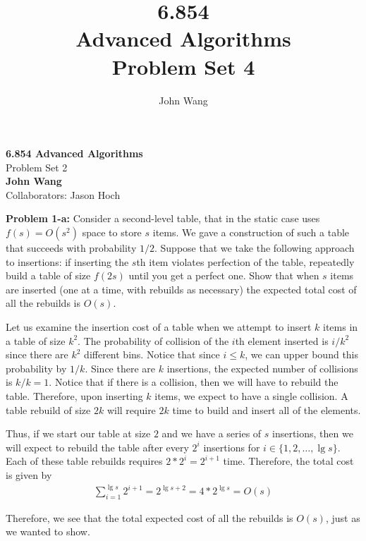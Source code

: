 \documentclass[psamsfonts]{amsart}
\title{6.854 \\
Advanced Algorithms \\
Problem Set 4}
\author{John Wang}
\newenvironment{sol}{\vspace{0.25cm}{\large \bfseries Solution:}}{\qedsymbol}
\newenvironment{prob}[1]{\begin{framed}{\large \bfseries Problem #1:}}{\end{framed}}
\newcommand{\makenewtitle}{
    \begin{center}
    {\huge \bfseries 6.854 Advanced Algorithms} \\
    Problem Set 2\\
    \vspace{0.25cm}
    {\bfseries John Wang} \\
    Collaborators: Jason Hoch
    \end{center}
    \vspace{0.5cm}
}
\begin{document}
\makenewtitle

\begin{prob}{1-a}
Consider a second-level table, that in the static case uses $f(s) = O(s^2)$ space to store $s$ items. We gave a construction of such a table that succeeds with probability $1/2$. Suppose that we take the following approach to insertions: if inserting the $s$th item violates perfection of the table, repeatedly build a table of size $f(2s)$ until you get a perfect one. Show that when $s$ items are inserted (one at a time, with rebuilds as necessary) the expected total cost of all the rebuilds is $O(s)$. 
\end{prob}

\begin{sol}
Let us examine the insertion cost of a table when we attempt to insert $k$ items in a table of size $k^2$. The probability of collision of the $i$th element inserted is $i/k^2$ since there are $k^2$ different bins. Notice that since $i \leq k$, we can upper bound this probability by $1/k$. Since there are $k$ insertions, the expected number of collisions is $k/k = 1$. Notice that if there is a collision, then we will have to rebuild the table. Therefore, upon inserting $k$ items, we expect to have a single collision. A table rebuild of size $2k$ will require $2k$ time to build and insert all of the elements. 

Thus, if we start our table at size $2$ and we have a series of $s$ insertions, then we will expect to rebuild the table after every $2^i$ insertions for $i \in \{1,2, \ldots, \lg s\}$. Each of these table rebuilds requires $2* 2^i = 2^{i+1}$ time. Therefore, the total cost is given by
\begin{eqnarray}
\sum_{i=1}^{\lg s} 2^{i+1} = 2^{\lg s + 2} = 4* 2^{\lg s} = O(s)
\end{eqnarray}

Therefore, we see that the total expected cost of all the rebuilds is $O(s)$, just as we wanted to show.
\end{sol}
\end{document}
